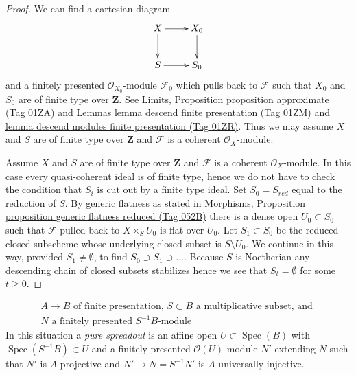 \documentclass{amsart}
\theoremstyle{plain}
\theoremstyle{definition}
\theoremstyle{remark}
\numberwithin{equation}{subsection}
\def\Spec{\mathop{\mathrm{Spec}}}
\begin{document}
\begin{proof}
We can find a cartesian diagram
$$
\xymatrix{
X \ar[d] \ar[r] & X_0 \ar[d] \\
S \ar[r] & S_0
}
$$
and a finitely presented $\mathcal{O}_{X_0}$-module $\mathcal{F}_0$
which pulls back to $\mathcal{F}$ such that $X_0$ and $S_0$ are of
finite type over $\mathbf{Z}$. See
Limits, Proposition \href{https://stacks.math.columbia.edu/tag/01ZA}{proposition approximate (Tag 01ZA)} and
Lemmas \href{https://stacks.math.columbia.edu/tag/01ZM}{lemma descend finite presentation (Tag 01ZM)} and
\href{https://stacks.math.columbia.edu/tag/01ZR}{lemma descend modules finite presentation (Tag 01ZR)}.
Thus we may assume $X$ and $S$ are of finite type over $\mathbf{Z}$
and $\mathcal{F}$ is a coherent $\mathcal{O}_X$-module.

\medskip\noindent
Assume $X$ and $S$ are of finite type over $\mathbf{Z}$
and $\mathcal{F}$ is a coherent $\mathcal{O}_X$-module.
In this case every quasi-coherent ideal is of finite type, hence
we do not have to check the condition that $S_i$ is cut out
by a finite type ideal. Set $S_0 = S_{red}$ equal to the reduction of $S$.
By generic flatness as stated in Morphisms, Proposition
\href{https://stacks.math.columbia.edu/tag/052B}{proposition generic flatness reduced (Tag 052B)}
there is a dense open $U_0 \subset S_0$ such that $\mathcal{F}$
pulled back to $X \times_S U_0$ is flat over $U_0$.
Let $S_1 \subset S_0$ be the reduced closed subscheme whose
underlying closed subset is $S \setminus U_0$. We continue in this
way, provided $S_1 \not = \emptyset$, to find
$S_0 \supset S_1 \supset \ldots$. Because $S$
is Noetherian any descending chain of closed subsets stabilizes
hence we see that $S_t = \emptyset$ for some $t \geq 0$.
\end{proof}


\begin{equation}
\label{equation-star}
\begin{matrix}
A \to B\text{ of finite presentation, }S \subset B
\text{ a multiplicative subset, and }\\
N\text{ a finitely presented }S^{-1}B\text{-module}
\end{matrix}
\end{equation}
In this situation a {\it pure spreadout} is an affine open
$U \subset \Spec(B)$ with $\Spec(S^{-1}B) \subset U$ and a
finitely presented $\mathcal{O}(U)$-module $N'$ extending $N$
such that $N'$ is $A$-projective and $N' \to N = S^{-1}N'$
is $A$-universally injective.
\end{document}
